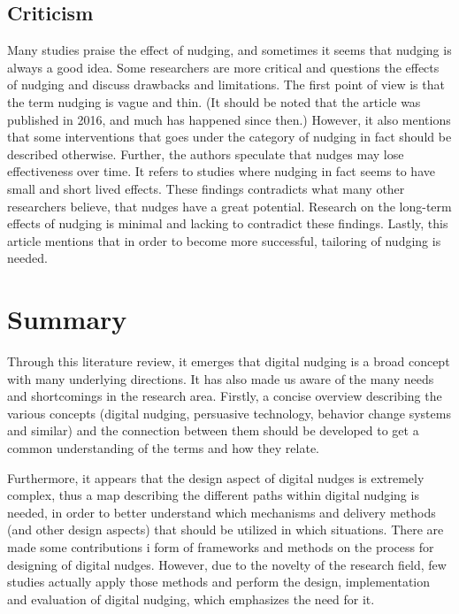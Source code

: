 \subsection{Criticism }
Many studies praise the effect of nudging, and sometimes it seems that nudging is always a good idea. Some researchers \cite{matjasko_applying_2016}
are more critical and questions the effects of nudging and discuss drawbacks and limitations. The first point of view is that the term nudging is vague and thin. (It should be noted that the article was published in 2016, and much has happened since then.) However, it also mentions that some interventions that goes under the category of nudging in fact should be described otherwise. Further, the authors speculate that nudges may lose effectiveness over time. It refers to studies where nudging in fact seems to have small and short lived effects. These findings contradicts what many other researchers believe, that nudges have a great potential. Research on the long-term effects of nudging is minimal and lacking to contradict these findings. Lastly, this article mentions that in order to become more successful, tailoring of nudging is needed. 

\section{Summary}
Through this literature review, it emerges that digital nudging is a broad concept with many underlying directions. It has also made us aware of the many needs and shortcomings in the research area. Firstly, a concise overview describing the various concepts (digital nudging, persuasive technology, behavior change systems and similar) and the connection between them should be developed to get a common understanding of the terms and how they relate.

Furthermore, it appears that the design aspect of digital nudges is extremely complex, thus a map describing the different paths within digital nudging is needed, in order to better understand which mechanisms and delivery methods (and other design aspects) that should be utilized in which situations. There are made some contributions i form of frameworks and methods on the process for designing of digital nudges. However, due to the novelty of the research field, few studies actually apply those methods and perform the design, implementation and evaluation of digital nudging, which emphasizes the need for it.

